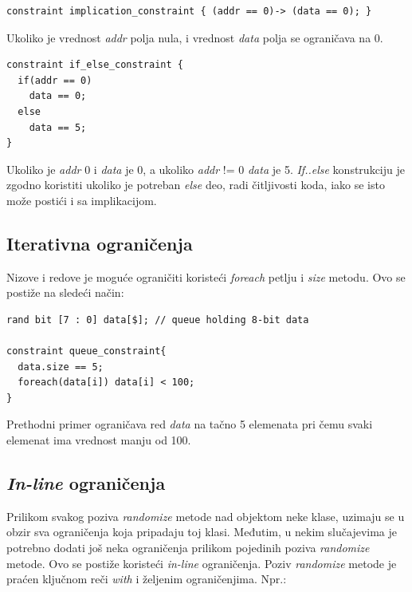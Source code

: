 \begin{lstlisting}
constraint implication_constraint { (addr == 0)-> (data == 0); }
\end{lstlisting}

Ukoliko je vrednost \emph{addr} polja nula, i vrednost \emph{data} polja se
ograničava na 0.

\begin{lstlisting}
constraint if_else_constraint {
  if(addr == 0)
    data == 0;
  else
    data == 5;
}
\end{lstlisting}

Ukoliko je \emph{addr} 0 i \emph{data} je 0, a ukoliko \emph{addr} != 0
\emph{data} je 5.
\emph{If..else} konstrukciju je zgodno koristiti ukoliko je potreban \emph{else}
deo, radi čitljivosti koda, iako se isto može postići i sa implikacijom.


\subsection{Iterativna ograničenja} \label{ssec:iter_constraints}

Nizove i redove je moguće ograničiti koristeći \emph{foreach} petlju i
\emph{size} metodu. Ovo se postiže na sledeći način:

\begin{lstlisting}
rand bit [7 : 0] data[$]; // queue holding 8-bit data

constraint queue_constraint{
  data.size == 5;
  foreach(data[i]) data[i] < 100;
}
\end{lstlisting}

Prethodni primer ograničava red \emph{data} na tačno 5 elemenata pri čemu svaki
elemenat ima vrednost manju od 100.


\subsection{\emph{In-line} ograničenja} \label{ssec:inline_constraints}

Prilikom svakog poziva \emph{randomize} metode nad objektom neke klase, uzimaju
se u obzir sva ograničenja koja pripadaju toj klasi. Međutim, u nekim
slučajevima je potrebno dodati još neka ograničenja prilikom pojedinih poziva
\emph{randomize} metode. Ovo se postiže koristeći \emph{in-line} ograničenja.
Poziv \emph{randomize} metode je praćen ključnom reči \emph{with} i željenim
ograničenjima. Npr.:


